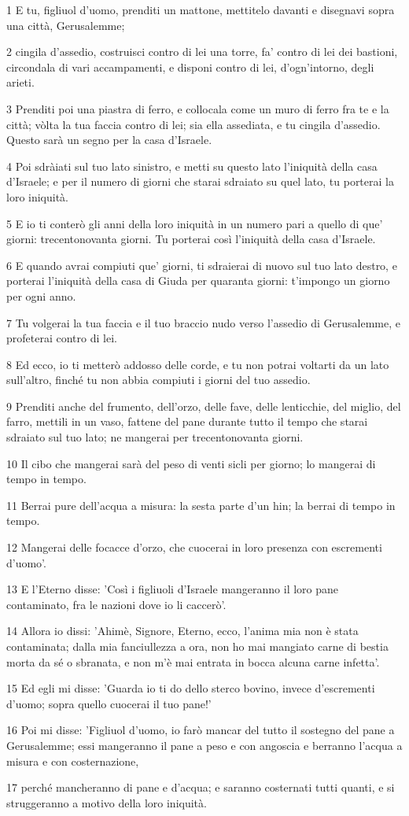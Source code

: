 \par 1 E tu, figliuol d'uomo, prenditi un mattone, mettitelo davanti e disegnavi sopra una città, Gerusalemme;
\par 2 cingila d'assedio, costruisci contro di lei una torre, fa' contro di lei dei bastioni, circondala di vari accampamenti, e disponi contro di lei, d'ogn'intorno, degli arieti.
\par 3 Prenditi poi una piastra di ferro, e collocala come un muro di ferro fra te e la città; vòlta la tua faccia contro di lei; sia ella assediata, e tu cingila d'assedio. Questo sarà un segno per la casa d'Israele.
\par 4 Poi sdràiati sul tuo lato sinistro, e metti su questo lato l'iniquità della casa d'Israele; e per il numero di giorni che starai sdraiato su quel lato, tu porterai la loro iniquità.
\par 5 E io ti conterò gli anni della loro iniquità in un numero pari a quello di que' giorni: trecentonovanta giorni. Tu porterai così l'iniquità della casa d'Israele.
\par 6 E quando avrai compiuti que' giorni, ti sdraierai di nuovo sul tuo lato destro, e porterai l'iniquità della casa di Giuda per quaranta giorni: t'impongo un giorno per ogni anno.
\par 7 Tu volgerai la tua faccia e il tuo braccio nudo verso l'assedio di Gerusalemme, e profeterai contro di lei.
\par 8 Ed ecco, io ti metterò addosso delle corde, e tu non potrai voltarti da un lato sull'altro, finché tu non abbia compiuti i giorni del tuo assedio.
\par 9 Prenditi anche del frumento, dell'orzo, delle fave, delle lenticchie, del miglio, del farro, mettili in un vaso, fattene del pane durante tutto il tempo che starai sdraiato sul tuo lato; ne mangerai per trecentonovanta giorni.
\par 10 Il cibo che mangerai sarà del peso di venti sicli per giorno; lo mangerai di tempo in tempo.
\par 11 Berrai pure dell'acqua a misura: la sesta parte d'un hin; la berrai di tempo in tempo.
\par 12 Mangerai delle focacce d'orzo, che cuocerai in loro presenza con escrementi d'uomo'.
\par 13 E l'Eterno disse: 'Così i figliuoli d'Israele mangeranno il loro pane contaminato, fra le nazioni dove io li caccerò'.
\par 14 Allora io dissi: 'Ahimè, Signore, Eterno, ecco, l'anima mia non è stata contaminata; dalla mia fanciullezza a ora, non ho mai mangiato carne di bestia morta da sé o sbranata, e non m'è mai entrata in bocca alcuna carne infetta'.
\par 15 Ed egli mi disse: 'Guarda io ti do dello sterco bovino, invece d'escrementi d'uomo; sopra quello cuocerai il tuo pane!'
\par 16 Poi mi disse: 'Figliuol d'uomo, io farò mancar del tutto il sostegno del pane a Gerusalemme; essi mangeranno il pane a peso e con angoscia e berranno l'acqua a misura e con costernazione,
\par 17 perché mancheranno di pane e d'acqua; e saranno costernati tutti quanti, e si struggeranno a motivo della loro iniquità.

